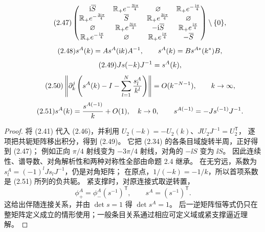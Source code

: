 \begin{equation}
\originaleq{2.47}
\begin{pmatrix}
\ii\overline S&\mathbb R_+e^{-\frac{3\ii\pi}{4}}&\varnothing&\mathbb R_+e^{-\frac{\ii\pi}{4}}\\
\mathbb R_+e^{-\frac{3\ii\pi}{4}}&\overline S&\mathbb R_+e^{\frac{3\ii\pi}{4}}&\varnothing\\
\varnothing&\mathbb R_+e^{\frac{3\ii\pi}{4}}&-\ii\overline S&\mathbb R_+e^{\frac{\ii\pi}{4}}\\
\mathbb R_+e^{-\frac{\ii\pi}{4}}&\varnothing&\mathbb R_+e^{\frac{\ii\pi}{4}}&-\overline S
\end{pmatrix}\setminus\{0\},
\end{equation}
\begin{equation}
\originaleq{2.48}
s^A(k)=As^A(\ii k)A^{-1},\qquad s^A(k)=Bs^{A*}(k^*)B,
\end{equation}
\begin{equation}
\originaleq{2.49}
Js(-k)J^{-1}=s^A(k),
\end{equation}
\begin{equation}
\originaleq{2.50}
\left\|\partial_k^j\left(s^A(k)-I-\sum\limits_{l=1}^N\dfrac{s_l^A}{k^l}\right)\right\|
=O(k^{-N-1}),\qquad k\to\infty,
\end{equation}
\begin{equation}
\originaleq{2.51}
s^A(k)=\dfrac{s^{A(-1)}}{k}+O(1),\quad k\to0,\qquad
s^{A(-1)}=-Js^{(-1)}J^{-1}.
\end{equation}
\begin{note}
\end{note}
\begin{proof}
将 (2.41) 代入 (2.46)，并利用 $U_2(-k)=-U_2(k)$、$JU_2J^{-1}=U_2^{\mathsf T}$，
逐项把共轭矩阵移出积分，得到 (2.49)。
它把 (2.34) 的各条目域旋转半周，正好得到 (2.47)；
例如正向 $\pi/4$ 射线变为 $-3\pi/4$ 射线，对角的 $-\ii S$ 变为 $\ii S$。
因此连续性、谱导数、对角解析性和两种对称性全部由命题 2.4 继承。
在无穷远，系数为 $s_l^A=(-1)^lJs_lJ^{-1}$，仍是对角矩阵；
在原点，$1/(-k)=-1/k$，所以首项系数是 (2.51) 所列的负共轭。
紧支撑时，对原连接式取逆转置，
\[
\phi_+^A=\phi_-^A(s^{-1})^{\mathsf T},\qquad
s^A=(s^{-1})^{\mathsf T}.
\]
这给出伴随连接关系，并由 $\det s=1$ 得 $\det s^A=1$。
后一逆矩阵恒等式仍只在整矩阵定义成立的情形使用；一般条目关系通过相应可定义域或紧支撑逼近理解。
\end{proof}
